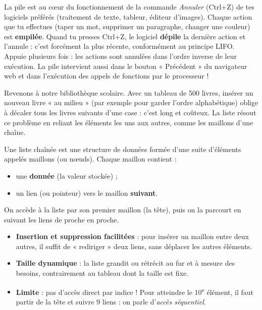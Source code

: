 \documentclass[11pt]{article}
\newcommand{\cle}[1]{{\popxbold\color{popdark}#1}}
\newcounter{popsec}
\newcounter{popsub}
\newcommand{\courssub}[1]{%
  \stepcounter{popsub}%
  \par\vspace{9pt}\noindent{\popxbold\fontsize{11.5}{13}\selectfont\color{popink}{\color{poporange}\thepopsec.\thepopsub}\hspace{6pt}#1}\par\nopagebreak\vspace{4pt}
}
\begin{document}
\begin{savaistu}
La pile est au cœur du fonctionnement de la commande \emph{Annuler} (Ctrl+Z) de tes logiciels préférés (traitement de texte, tableur, éditeur d'images). Chaque action que tu effectues (taper un mot, supprimer un paragraphe, changer une couleur) est \textbf{empilée}. Quand tu presses Ctrl+Z, le logiciel \textbf{dépile} la dernière action et l'annule : c'est forcément la plus récente, conformément au principe LIFO. Appuie plusieurs fois : les actions sont annulées dans l'ordre inverse de leur exécution. La pile intervient aussi dans le bouton « Précédent » du navigateur web et dans l'exécution des appels de fonctions par le processeur !
\end{savaistu}

\courssub{La liste : des éléments chaînés}

Revenons à notre bibliothèque scolaire. Avec un tableau de 500 livres, insérer un nouveau livre « au milieu » (par exemple pour garder l'ordre alphabétique) oblige à décaler tous les livres suivants d'une case : c'est long et coûteux. La \cle{liste} résout ce problème en reliant les éléments les uns aux autres, comme les maillons d'une chaîne.

\begin{definition}
Une \cle{liste chaînée} est une structure de données formée d'une suite d'éléments appelés \cle{maillons} (ou nœuds). Chaque maillon contient :
\begin{itemize}
  \item une \textbf{donnée} (la valeur stockée) ;
  \item un \cle{lien} (ou pointeur) vers le maillon \textbf{suivant}.
\end{itemize}
On accède à la liste par son \cle{premier maillon} (la tête), puis on la parcourt en suivant les liens de proche en proche.
\end{definition}

\begin{propriete}
\begin{itemize}
  \item \textbf{Insertion et suppression facilitées} : pour insérer un maillon entre deux autres, il suffit de « rediriger » deux liens, sans déplacer les autres éléments.
  \item \textbf{Taille dynamique} : la liste grandit ou rétrécit au fur et à mesure des besoins, contrairement au tableau dont la taille est fixe.
  \item \textbf{Limite} : pas d'accès direct par indice ! Pour atteindre le 10\textsuperscript{e} élément, il faut partir de la tête et suivre 9 liens : on parle d'\emph{accès séquentiel}.
\end{itemize}
\end{propriete}
\end{document}

